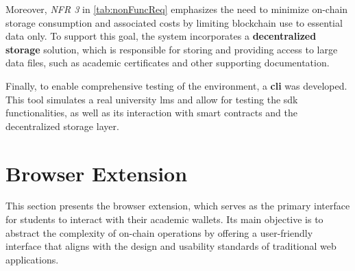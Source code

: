 Moreover, \textit{NFR 3} in \cref{tab:nonFuncReq} emphasizes the need to minimize on-chain storage consumption and associated costs by limiting blockchain use to essential data only. To support this goal, the system incorporates a \textbf{decentralized storage} solution, which is responsible for storing and providing access to large data files, such as academic certificates and other supporting documentation.

Finally, to enable comprehensive testing of the environment, a \textbf{\acrlong{cli}} was developed. This tool simulates a real university \acrshort{lms} and allow for testing the \acrshort{sdk} functionalities, as well as its interaction with smart contracts and the decentralized storage layer.


\section{Browser Extension}
\label{sec:browserExtensionDesign}
This section presents the browser extension, which serves as the primary interface for students to interact with their academic wallets. Its main objective is to abstract the complexity of on-chain operations by offering a user-friendly interface that aligns with the design and usability standards of traditional web applications.

